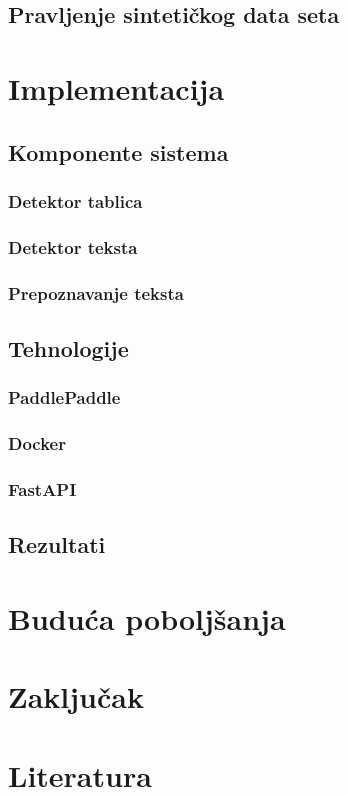 \documentclass[a4paper,12pt]{article}
\begin{document}
	\subsection{Pravljenje sintetičkog data seta}
	\newpage
	
	\section{Implementacija}
	\subsection{Komponente sistema}
	\subsubsection{Detektor tablica}
	\subsubsection{Detektor teksta}
	\subsubsection{Prepoznavanje teksta}
	\subsection{Tehnologije}
	\subsubsection{PaddlePaddle}
	\subsubsection{Docker}
	\subsubsection{FastAPI}
	\subsection{Rezultati}
	\newpage
	
	\section{Buduća poboljšanja}
	\newpage
	
	\section{Zaključak}
	\newpage
	
	\section*{Literatura}
	\newpage
\end{document}
